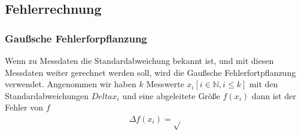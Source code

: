 \subsection{Fehlerrechnung}
\subsubsection{Gaußsche Fehlerforpflanzung}
Wenn zu Messdaten die Standardabweichung bekannt ist, und mit diesen Messdaten weiter gerechnet werden soll,
wird die Gaußsche Fehlerfortpflanzung verwendet. 
Angenommen wir haben $k$ Messwerte $x_i [i \in \mathbb{N}, i \leq k]$ mit den Standardabweichungen $Delta x_i$
und eine abgeleitete Größe $f(x_i)$ dann ist der Fehler von $f$
\begin{align}
    \Delta f(x_i) = \sqrt{}
\end{align} 